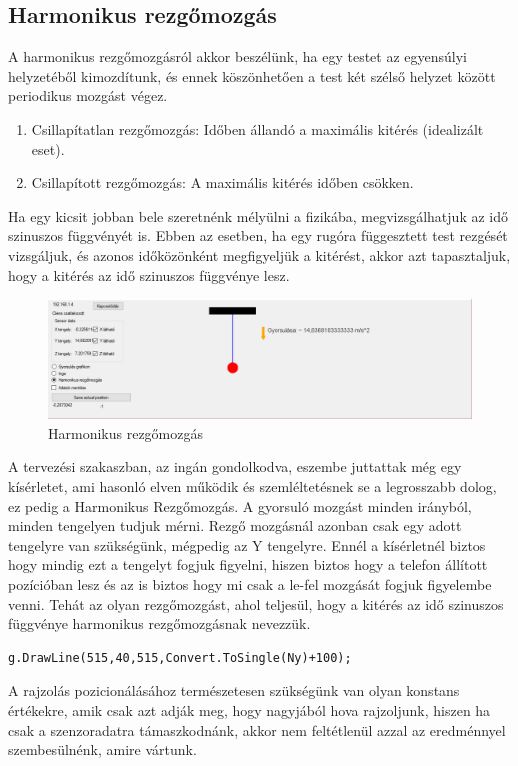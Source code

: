 \documentclass{thesis-ekf}
\theoremstyle{definition}
\theoremstyle{remark}
\begin{document}
\subsection{Harmonikus rezgőmozgás}
A harmonikus rezgőmozgásról akkor beszélünk, ha egy testet az egyensúlyi helyzetéből kimozdítunk, és ennek köszönhetően a test két szélső helyzet között periodikus mozgást végez.
\begin{enumerate}
	\item Csillapítatlan rezgőmozgás: Időben állandó a maximális kitérés (idealizált eset).
	\item Csillapított rezgőmozgás: A maximális kitérés időben csökken.
\end{enumerate}
\par Ha egy kicsit jobban bele szeretnénk mélyülni a fizikába, megvizsgálhatjuk az idő szinuszos függvényét is. Ebben az esetben, ha egy rugóra függesztett test rezgését vizsgáljuk, és azonos időközönként megfigyeljük a kitérést, akkor azt tapasztaljuk, hogy a kitérés az idő szinuszos függvénye lesz.
\begin{figure}[!h]
	\centering
	\includegraphics[width=15cm]{harmonikus}
	\caption{Harmonikus rezgőmozgás}\label{harmonikus}
\end{figure}
\par A tervezési szakaszban, az ingán gondolkodva, eszembe juttattak még egy kísérletet, ami hasonló elven működik és szemléltetésnek se a legrosszabb dolog, ez pedig a Harmonikus Rezgőmozgás. A gyorsuló mozgást minden irányból, minden tengelyen tudjuk mérni. Rezgő mozgásnál azonban csak egy adott tengelyre van szükségünk, mégpedig az Y tengelyre. Ennél a kísérletnél biztos hogy mindig ezt a tengelyt fogjuk figyelni, hiszen biztos hogy a telefon állított pozícióban lesz és az is biztos hogy mi csak a le-fel mozgását fogjuk figyelembe venni.  Tehát az olyan rezgőmozgást, ahol teljesül, hogy a kitérés az idő szinuszos függvénye harmonikus rezgőmozgásnak nevezzük.
 \begin{lstlisting}
g.DrawLine(515,40,515,Convert.ToSingle(Ny)+100);
 \end{lstlisting}
\par A rajzolás pozicionálásához természetesen szükségünk van olyan konstans értékekre, amik csak azt adják meg, hogy nagyjából hova rajzoljunk, hiszen ha csak a szenzoradatra támaszkodnánk, akkor nem feltétlenül azzal az eredménnyel szembesülnénk, amire vártunk.
\end{document}
